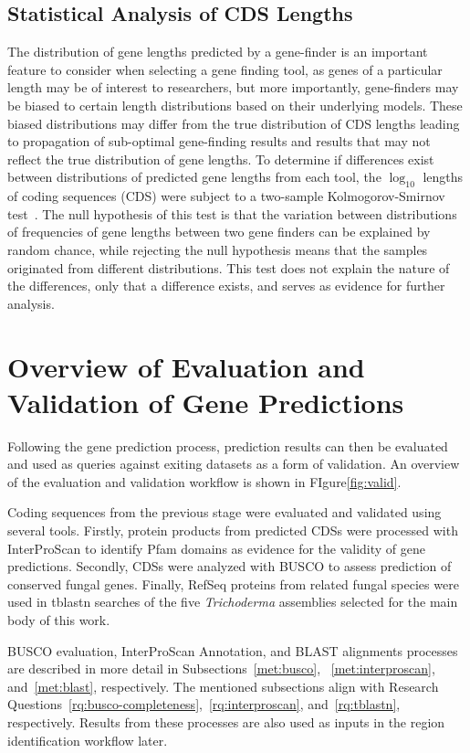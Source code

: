 \subsection{Statistical Analysis of CDS Lengths}\label{met:cds-stats}

The distribution of gene lengths predicted by a gene-finder is an
important feature to consider when selecting a gene finding tool, as
genes of a particular length may be of interest to researchers, but
more importantly, gene-finders may be biased to certain length distributions
based on their underlying models. These
biased distributions may differ from the true distribution of CDS
lengths leading to propagation of sub-optimal gene-finding results and
results that may not reflect the true distribution of gene lengths. To
determine if differences exist between distributions of predicted
gene lengths from each tool, the $\log_{10}$ lengths of coding
sequences (CDS) were subject to a two-sample Kolmogorov-Smirnov
test~\cite{2008}. The null hypothesis of this test is that the variation between distributions of frequencies of gene lengths between two gene finders can be explained by random chance, while rejecting the null hypothesis means that the samples originated from different distributions. This test does not explain the nature of the differences, only that a difference exists, and serves as evidence for further analysis.

\section{Overview of Evaluation and Validation of Gene Predictions}\label{met:valid-workflow}

Following the gene prediction process, prediction results can then be
evaluated and used as queries against exiting datasets as a form of
validation. An overview of the evaluation and validation workflow is shown in FIgure\ref{fig:valid}.

Coding sequences from the previous stage were evaluated and validated
using several tools. Firstly, protein products from predicted CDSs
were processed with InterProScan to identify Pfam domains as evidence
for the validity of gene predictions. Secondly, CDSs were analyzed
with BUSCO to assess prediction of conserved fungal genes. Finally,
RefSeq proteins from related fungal species were used in tblastn
searches of the five \textit{Trichoderma} assemblies selected for the
main body of this work.

BUSCO evaluation, InterProScan Annotation, and BLAST alignments
processes are described in more detail in Subsections~\ref{met:busco},
~\ref{met:interproscan}, and~\ref{met:blast}, respectively. The mentioned subsections align with Research Questions~\ref{rq:busco-completeness},~\ref{rq:interproscan}, and~\ref{rq:tblastn}, respectively.  
Results from these processes are also used as inputs in the region
identification workflow later.

